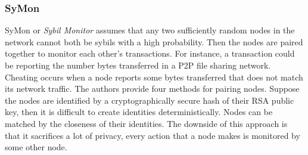 \subsubsection{SyMon}
SyMon\cite{jyothi2009symon} or \emph{Sybil Monitor} assumes that any two
sufficiently random nodes in the network cannot both be sybils with a high
probability. Then the nodes are paired together to monitor each other's
transactions. For instance, a transaction could be reporting the number bytes
transferred in a P2P file sharing network. Cheating occurs when a node reports
some bytes transferred that does not match its network traffic. The authors
provide four methods for pairing nodes. Suppose the nodes are identified by a
cryptographically secure hash of their RSA public key, then it is difficult to
create identities deterministically. Nodes can be matched by the closeness of
their identities. The downside of this approach is that it sacrifices a lot of
privacy, every action that a node makes is monitored by some other node.


